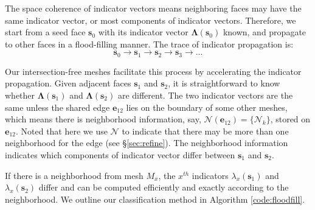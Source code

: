 \documentclass[10pt,journal,compsoc]{IEEEtran}
\begin{document}
The space coherence of indicator vectors means neighboring faces may have the same indicator vector, or most components of indicator vectors. Therefore, we start from a seed face $\bm{s}_0$ with its indicator vector $\bm{\Lambda}(\bm{s}_0)$ known, and propagate to other faces in a flood-filling manner. The trace of indicator propagation is:
\begin{equation}
\label{eq:trace}
\bm{s}_0\to \bm{s}_1\to \bm{s}_2\to \bm{s}_3\to ...
\end{equation}


Our intersection-free meshes facilitate this process by accelerating the indicator propagation. Given adjacent faces $\bm{s}_1$ and $\bm{s}_2$, it is straightforward to know whether $\bm{\Lambda}(\bm{s}_1)$ and $\bm{\Lambda}(\bm{s}_2)$ are different. The two indicator vectors are the same unless the shared edge $\bm{e}_{12}$ lies on the boundary of some other meshes, which means there is neighborhood information, say, $\bm{\mathcal{N}}(\bm{e}_{12}) = \{\mathcal{N}_k\}$, stored on $\bm{e}_{12}$. Noted that here we use $\bm{\mathcal{N}}$ to indicate that there may be more than one neighborhood for the edge (see \S\ref{sec:refine}). The neighborhood information indicates which components of indicator vector differ between $\bm{s}_1$ and $\bm{s}_2$.

If there is a neighborhood from mesh $M_x$, the $x^{th}$ indicators $\lambda_x(\bm{s}_1)$ and $\lambda_x(\bm{s}_2)$ differ and can be computed efficiently and exactly according to the neighborhood. We outline our classification method in Algorithm \ref{code:floodfill}.
\end{document}
